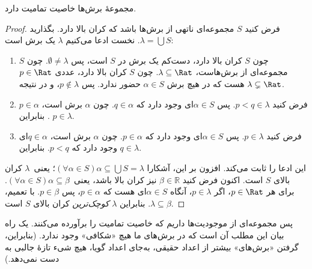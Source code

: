 \documentclass[../../../include/open-logic-section]{subfiles}
\begin{document}
\begin{thm}
مجموعهٔ برش‌ها خاصیت تمامیت دارد.
\end{thm}

\begin{proof}
فرض کنید $S$ مجموعه‌ای ناتهی از برش‌ها باشد که کران بالا دارد. بگذارید
$\lambda = \bigcup S$.
نخست ادعا می‌کنیم $\lambda$ یک برش است:
\begin{enumerate}
\item چون $S$ کران بالا دارد، دست‌کم یک برش در $S$ است، پس
$\emptyset \neq \lambda$. چون $S$ مجموعه‌ای از برش‌هاست، $\lambda
\subseteq \Rat$. چون $S$ کران بالا دارد، عددی $p \in \Rat$ هست که در
هیچ برش $\alpha \in S$ حضور ندارد. پس $p\notin \lambda$، و در نتیجه
$\lambda \subsetneq \Rat$.
\item فرض کنید $p < q \in \lambda$. پس $\alpha \in S$ای وجود دارد که
$q \in \alpha$. چون $\alpha$ برش است، $p \in \alpha$. بنابراین
$p \in \lambda$.
\item فرض کنید $p \in \lambda$. پس $\alpha \in S$ای وجود دارد که
$p \in \alpha$. چون $\alpha$ برش است، $q \in \alpha$ای وجود دارد که
$p < q$. بنابراین $q \in \lambda$.
\end{enumerate}
این ادعا را ثابت می‌کند. افزون بر این، آشکارا $(\forall \alpha \in
S)\alpha \subseteq \bigcup S = \lambda$؛ یعنی\ $\lambda$ کران بالای
$S$ است. اکنون فرض کنید $\beta \in \mathbb{R}$ نیز کران بالا باشد، یعنی\ $(\forall
\alpha \in S)\alpha \subseteq \beta$. برای هر $p \in \Rat$،
اگر $p \in \lambda$، آنگاه $\alpha \in S$ای هست که $p \in \alpha$،
پس $p \in \beta$. با تعمیم، $\lambda \subseteq \beta$. بنابراین
$\lambda$ \emph{کوچک‌ترین} کران بالای $S$ است.
\end{proof}

پس مجموعه‌ای از موجودیت‌ها داریم که خاصیت تمامیت را برآورده می‌کنند. یک
راه بیان این مطلب آن است که در برش‌های ما هیچ «شکافی» وجود ندارد. (بنابراین،
گرفتن «برش‌های» بیشتر از اعداد حقیقی، به‌جای اعداد گویا، هیچ شیء تازهٔ
جالبی به دست نمی‌دهد.)
\end{document}

